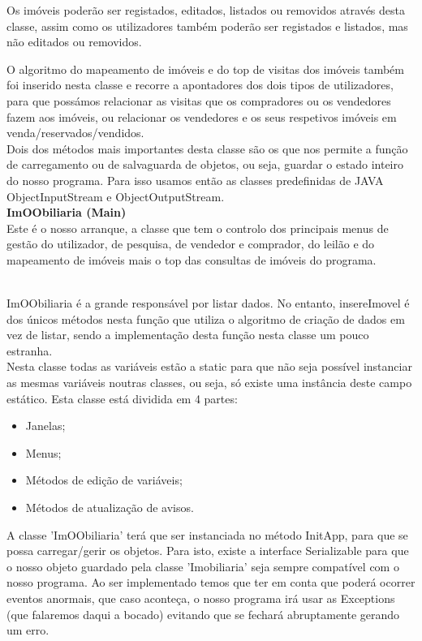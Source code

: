 \documentclass[12pt]{article}
\begin{document}
Os imóveis poderão ser registados, editados, listados ou removidos através desta classe, assim como os utilizadores também poderão ser registados e listados, mas não editados ou removidos.

O algoritmo do mapeamento de imóveis e do top de visitas dos imóveis também foi inserido nesta classe e recorre a apontadores dos dois tipos de utilizadores, para que possámos relacionar as visitas que os compradores ou os vendedores fazem aos imóveis, ou relacionar os vendedores e os seus respetivos imóveis em venda/reservados/vendidos.
~\\

Dois dos métodos mais importantes desta classe são os que nos permite a função de carregamento ou de salvaguarda de objetos, ou seja, guardar o estado inteiro do nosso programa.
Para isso usamos então as classes predefinidas de JAVA ObjectInputStream e ObjectOutputStream. 
~\\

\textbf{ImOObiliaria (Main)}
\newline
~\\

Este é o nosso arranque, a classe que tem o controlo dos principais menus de gestão do utilizador, de pesquisa, de vendedor e comprador, do leilão e do mapeamento de imóveis mais o top das consultas de imóveis do programa.

~\\
ImOObiliaria é a grande responsável por listar dados. No entanto, insereImovel é dos únicos métodos nesta função que utiliza o algoritmo de criação de dados em vez de listar, sendo a implementação desta função nesta classe um pouco estranha.
~\\
Nesta classe todas as variáveis estão a static para que não seja possível instanciar as mesmas
variáveis noutras classes, ou seja, só existe uma instância deste campo estático.
Esta classe está dividida em 4 partes:
\newline
\begin{itemize}
\item Janelas;
\item Menus;
\item Métodos de edição de variáveis;
\item Métodos de atualização de avisos.
\end{itemize}

A classe 'ImOObiliaria' terá que ser instanciada no método
InitApp, para que se possa carregar/gerir os objetos.
Para isto, existe a interface Serializable para que o nosso objeto guardado pela classe 'Imobiliaria'
seja sempre compatível com o nosso programa. Ao ser implementado temos que ter em conta
que poderá ocorrer eventos anormais, que caso aconteça, o nosso programa irá usar as Exceptions (que falaremos daqui a bocado)
evitando que se fechará abruptamente gerando um erro. 
~\\
\end{document}
